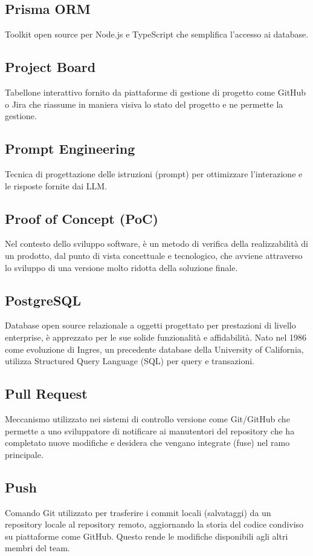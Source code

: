 \documentclass[10pt, letterpaper]{article}
\begin{document}
\subsection*{Prisma ORM}
Toolkit open source per Node.js e TypeScript che semplifica l'accesso ai database.

\subsection*{Project Board}
Tabellone interattivo fornito da piattaforme di gestione di progetto come GitHub o Jira che riassume in maniera visiva lo stato del progetto e ne permette
la gestione.

\subsection*{Prompt Engineering}
Tecnica di progettazione delle istruzioni (prompt) per ottimizzare l'interazione e le risposte fornite dai LLM.

\subsection*{Proof of Concept (PoC)}
Nel contesto dello sviluppo software, è un metodo di verifica della realizzabilità di un prodotto, dal punto di vista concettuale e tecnologico, che avviene
attraverso lo sviluppo di una versione molto ridotta della soluzione finale.

\subsection*{PostgreSQL}
Database open source relazionale a oggetti progettato per prestazioni di livello enterprise, è apprezzato per le sue solide funzionalità e affidabilità.
Nato nel 1986 come evoluzione di Ingres, un precedente database della University of California, utilizza Structured Query Language (SQL) per query e transazioni.

\subsection*{Pull Request}
Meccanismo utilizzato nei sistemi di controllo versione come Git/GitHub che permette a uno sviluppatore di notificare ai manutentori del repository che ha
completato nuove modifiche e desidera che vengano integrate (fuse) nel ramo principale.

\subsection*{Push}
Comando Git utilizzato per trasferire i commit locali (salvataggi) da un repository locale al repository remoto, aggiornando la storia del codice condiviso
su piattaforme come GitHub. Questo rende le modifiche disponibili agli altri membri del team.
\end{document}
